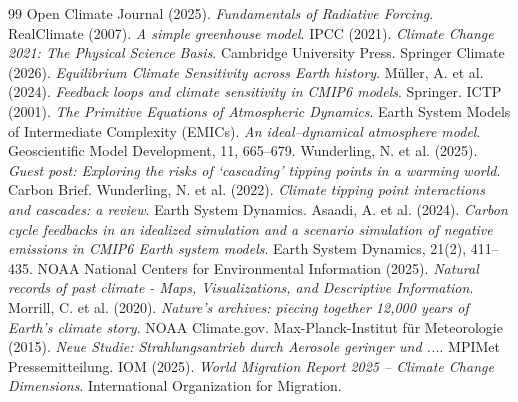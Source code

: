 \documentclass[12pt, a4paper]{article}
\begin{document}
\begin{thebibliography}{99}
		 Open Climate Journal (2025). \textit{Fundamentals of Radiative Forcing}.
		 RealClimate (2007). \textit{A simple greenhouse model}.
		 IPCC (2021). \textit{Climate Change 2021: The Physical Science Basis}. Cambridge University Press.
		 Springer Climate (2026). \textit{Equilibrium Climate Sensitivity across Earth history}.
		 Müller, A. et al. (2024). \textit{Feedback loops and climate sensitivity in CMIP6 models}. Springer.
		 ICTP (2001). \textit{The Primitive Equations of Atmospheric Dynamics}.
		 Earth System Models of Intermediate Complexity (EMICs). \textit{An ideal–dynamical atmosphere model}. Geoscientific Model Development, 11, 665–679.
		 Wunderling, N. et al. (2025). \textit{Guest post: Exploring the risks of ‘cascading’ tipping points in a warming world}. Carbon Brief.
		 Wunderling, N. et al. (2022). \textit{Climate tipping point interactions and cascades: a review}. Earth System Dynamics.
		 Asaadi, A. et al. (2024). \textit{Carbon cycle feedbacks in an idealized simulation and a scenario simulation of negative emissions in CMIP6 Earth system models}. Earth System Dynamics, 21(2), 411–435.
		 NOAA National Centers for Environmental Information (2025). \textit{Natural records of past climate - Maps, Visualizations, and Descriptive Information}.
		 Morrill, C. et al. (2020). \textit{Nature’s archives: piecing together 12,000 years of Earth’s climate story}. NOAA Climate.gov.
		 Max-Planck-Institut für Meteorologie (2015). \textit{Neue Studie: Strahlungsantrieb durch Aerosole geringer und ...}. MPIMet Pressemitteilung.
		 IOM (2025). \textit{World Migration Report 2025 – Climate Change Dimensions}. International Organization for Migration.
	\end{thebibliography}
	
\end{document}
